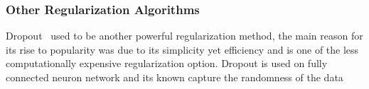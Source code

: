 \subsubsection{Other Regularization Algorithms}

Dropout~\cite{JMLR:v15:srivastava14a} used to be another powerful regularization method, the main reason for its rise to popularity was due to its simplicity yet efficiency and is one of the less computationally expensive regularization option. Dropout is used on fully connected neuron network and its known capture the randomness of the data